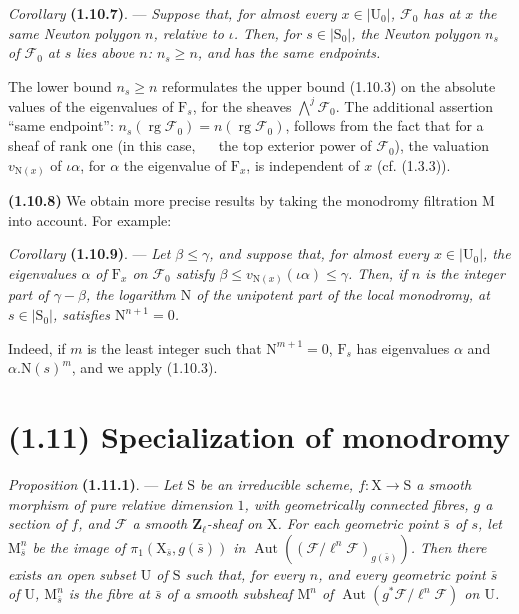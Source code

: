 \documentclass[11pt,leqno]{article}
\newcommand{\Page}[1]{\ifvmode\noindent\else\unskip\ \fi{\footnotesize\textcolor{gray}{[p.\,#1]}}\ \ignorespaces}
\begin{document}
\textit{Corollary} \textbf{(1.10.7)}. — \textit{Suppose that, for almost every \(x\in\lvert\mathrm{U}_0\rvert\), \(\mathscr{F}_0\) has at \(x\) the same Newton polygon \(n\), relative to \(\iota\). Then, for \(s\in\lvert\mathrm{S}_0\rvert\), the Newton polygon \(n_s\) of \(\mathscr{F}_0\) at \(s\) lies above \(n\): \(n_s\geq n\), and has the same endpoints.}

The lower bound \(n_s\geq n\) reformulates the upper bound (1.10.3) on the absolute values of the eigenvalues of \(\mathrm{F}_s\), for the sheaves \(\bigwedge\limits^{j}\mathscr{F}_0\). The additional assertion “same endpoint”: \(n_s(\operatorname{rg}\mathscr{F}_0)=n(\operatorname{rg}\mathscr{F}_0)\), follows from the fact that for a sheaf of rank one (in this case,
\Page{184}
the top exterior power of \(\mathscr{F}_0\)), the valuation \(v_{\mathrm{N}(x)}\) of \(\iota\alpha\), for \(\alpha\) the eigenvalue of \(\mathrm{F}_x\), is independent of \(x\) (cf. (1.3.3)).

\textbf{(1.10.8)} We obtain more precise results by taking the monodromy filtration \(\mathrm{M}\) into account. For example:

\textit{Corollary} \textbf{(1.10.9)}. — \textit{Let \(\beta\leq\gamma\), and suppose that, for almost every \(x\in\lvert\mathrm{U}_0\rvert\), the eigenvalues \(\alpha\) of \(\mathrm{F}_x\) on \(\mathscr{F}_0\) satisfy \(\beta\leq v_{\mathrm{N}(x)}(\iota\alpha)\leq\gamma\). Then, if \(n\) is the integer part of \(\gamma-\beta\), the logarithm \(\mathrm{N}\) of the unipotent part of the local monodromy, at \(s\in\lvert\mathrm{S}_0\rvert\), satisfies \(\mathrm{N}^{n+1}=0\).}

Indeed, if \(m\) is the least integer such that \(\mathrm{N}^{m+1}=0\), \(\mathrm{F}_s\) has eigenvalues \(\alpha\) and \(\alpha.\mathrm{N}(s)^m\), and we apply (1.10.3).

\section*{(1.11) Specialization of monodromy}

\textit{Proposition} \textbf{(1.11.1)}. — \textit{Let \(\mathrm{S}\) be an irreducible scheme, \(f:\mathrm{X}\to\mathrm{S}\) a smooth morphism of pure relative dimension \(1\), with geometrically connected fibres, \(g\) a section of \(f\), and \(\mathscr{F}\) a smooth \(\mathbf{Z}_\ell\)-sheaf on \(\mathrm{X}\). For each geometric point \(\bar{s}\) of \(s\), let \(\mathrm{M}_{\bar{s}}^n\) be the image of \(\pi_1(\mathrm{X}_{\bar{s}},g(\bar{s}))\) in \(\operatorname{Aut}((\mathscr{F}/\ell^n\mathscr{F})_{g(\bar{s})})\). Then there exists an open subset \(\mathrm{U}\) of \(\mathrm{S}\) such that, for every \(n\), and every geometric point \(\bar{s}\) of \(\mathrm{U}\), \(\mathrm{M}_{\bar{s}}^n\) is the fibre at \(\bar{s}\) of a smooth subsheaf \(\mathrm{M}^n\) of \(\operatorname{Aut}(g^*\mathscr{F}/\ell^n\mathscr{F})\) on \(\mathrm{U}\).}
\end{document}
